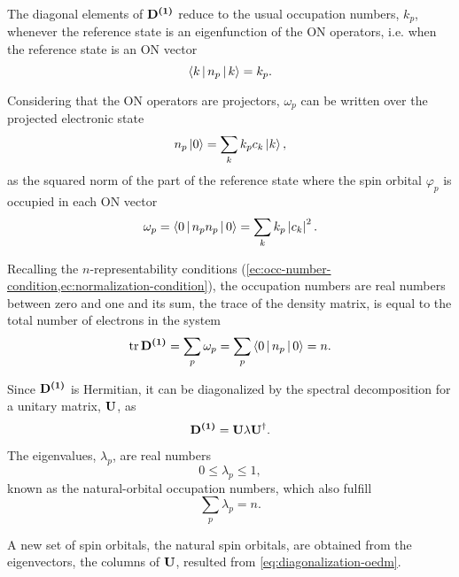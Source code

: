 The diagonal elements of $ \mat{\oedm}$ reduce to the usual occupation numbers,
$k_p$, whenever the reference state is an eigenfunction of the ON operators, i.e.
when the reference state is an ON vector 
\begin{equation}
    \Braket{k | n_p | k} = k_p
    .
\end{equation}

Considering that the ON operators are projectors, $\omega_p$ can be written 
over the projected electronic state 
\begin{equation}
    n_p \Ket{0} = \sum_{k} k_p c_k \Ket{k}
    ,
\end{equation}
as 
the squared norm of the part of the reference state where the spin orbital
$\varphi_p$ is occupied in each ON vector
\begin{equation}
    \omega_p =
    \Braket{0 | n_p n_p | 0} =
    \sum_{k} k_p \left| c_k \right|^2
    .
\end{equation}

Recalling the $n$-representability conditions 
(\cref{ec:occ-number-condition,ec:normalization-condition}),
the occupation numbers are real numbers between zero and one 
and its sum, the trace of the density matrix, is equal to the total number
of electrons in the system 
\begin{equation}
    \trace \mat{\oedm} =
    \sum_{p} \omega_p =
    \sum_{p} \Braket{0 | n_p | 0} =
    n
    .
\end{equation}

Since $ \mat{\oedm}$ is Hermitian, it can be diagonalized by the spectral
decomposition for a unitary matrix, $ \mat{U}$, as
\begin{equation} \label{eq:diagonalization-oedm}
    \mat{\oedm} =
    \mat{U} \lambda \mat{U}^{\dagger}
    .
\end{equation}

The eigenvalues, $\lambda_p$, are real numbers 
\begin{equation}
    0 \le \lambda_p \le 1
    ,
\end{equation}
known as the natural-orbital occupation numbers, which also fulfill 
\begin{equation}
    \sum_{p} \lambda_p = n
    .
\end{equation}

A new set of spin orbitals, the natural spin orbitals, are obtained from the
eigenvectors, the columns of $ \mat{U}$, resulted from 
\cref{eq:diagonalization-oedm}.

